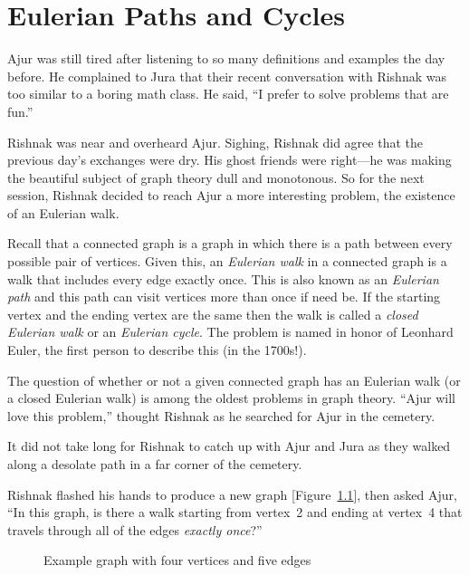 \chapter{Eulerian Paths and Cycles}

Ajur was still tired after listening to so many definitions and examples the day before. He complained to Jura that their recent conversation with Rishnak was too similar to a boring math class. He said, ``I prefer to solve problems that are fun.''

Rishnak was near and overheard Ajur. Sighing, Rishnak did agree that the previous day's exchanges were dry. His ghost friends were right---he was making the beautiful subject of graph theory dull and monotonous. So for the next session, Rishnak decided to reach Ajur a more interesting problem, the existence of an Eulerian walk.

Recall that a connected graph is a graph in which there is a path between every possible pair of vertices. Given this, an \textit{Eulerian walk} in a connected graph is a walk that includes every edge exactly once. This is also known as an \textit{Eulerian path} and this path can visit vertices more than once if need be. If the starting vertex and the ending vertex are the same then the walk is called a \textit{closed Eulerian walk} or an \textit{Eulerian cycle}. The problem is named in honor of Leonhard Euler, the first person to describe this (in the 1700s!).

The question of whether or not a given connected graph has an Eulerian walk (or a closed Eulerian walk) is among the oldest problems in graph theory. ``Ajur will love this problem,'' thought Rishnak as he searched for Ajur in the cemetery.

It did not take long for Rishnak to catch up with Ajur and Jura as they walked along a desolate path in a far corner of the cemetery.

Rishnak flashed his hands to produce a new graph [Figure~\ref{4g1}], then asked Ajur, ``In this graph, is there a walk starting from vertex~2 and ending at vertex~4 that travels through all of the edges \textit{exactly once}?''

\begin{figure}
\begin{center}
\caption{Example graph with four vertices and five edges}\label{4g1}
\end{center}
\end{figure}

